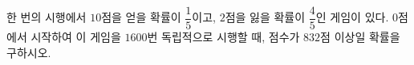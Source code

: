 한 번의 시행에서 $10$점을 얻을 확률이 $\dfrac{1}{5}$이고, $2$점을 잃을 확률이 $\dfrac{4}{5}$인 게임이 있다. $0$점에서 시작하여 이 게임을 $1600$번 독립적으로 시행할 때, 점수가 $832$점 이상일 확률을 구하시오. 
